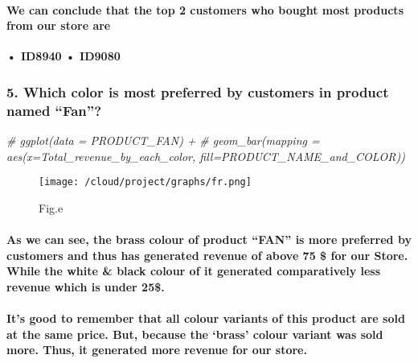 \documentclass[
]{article}
\newenvironment{Shaded}{\begin{snugshade}}{\end{snugshade}}
\newcommand{\CommentTok}[1]{\textcolor[rgb]{0.56,0.35,0.01}{\textit{#1}}}
\begin{document}
\hypertarget{we-can-conclude-that-the-top-2-customers-who-bought-most-products-from-our-store-are}{%
\paragraph{We can conclude that the top 2 customers who bought most
products from our store
are}\label{we-can-conclude-that-the-top-2-customers-who-bought-most-products-from-our-store-are}}

\textbf{• ID8940} \textbf{• ID9080}

\hypertarget{which-color-is-most-preferred-by-customers-in-product-named-fan-1}{%
\subsubsection{5. Which color is most preferred by customers in product
named
``Fan''?}\label{which-color-is-most-preferred-by-customers-in-product-named-fan-1}}

\begin{Shaded}
\begin{Highlighting}[]
\CommentTok{\# ggplot(data = PRODUCT\_FAN) +}
\CommentTok{\#   geom\_bar(mapping = aes(x=Total\_revenue\_by\_each\_color, fill=PRODUCT\_NAME\_and\_COLOR))}
\end{Highlighting}
\end{Shaded}

\begin{figure}
\centering
\texttt{[image: /cloud/project/graphs/fr.png]}
\caption{Fig.e}
\end{figure}

\hypertarget{as-we-can-see-the-brass-colour-of-product-fan-is-more-preferred-by-customers-and-thus-has-generated-revenue-of-above-75-for-our-store.-while-the-white-black-colour-of-it-generated-comparatively-less-revenue-which-is-under-25.}{%
\paragraph{As we can see, the brass colour of product ``FAN'' is more
preferred by customers and thus has generated revenue of above 75 \$ for
our Store. While the white \& black colour of it generated comparatively
less revenue which is under
25\$.}\label{as-we-can-see-the-brass-colour-of-product-fan-is-more-preferred-by-customers-and-thus-has-generated-revenue-of-above-75-for-our-store.-while-the-white-black-colour-of-it-generated-comparatively-less-revenue-which-is-under-25.}}

\hypertarget{its-good-to-remember-that-all-colour-variants-of-this-product-are-sold-at-the-same-price.-but-because-the-brass-colour-variant-was-sold-more.-thus-it-generated-more-revenue-for-our-store.}{%
\paragraph{It's good to remember that all colour variants of this
product are sold at the same price. But, because the `brass' colour
variant was sold more. Thus, it generated more revenue for our
store.}\label{its-good-to-remember-that-all-colour-variants-of-this-product-are-sold-at-the-same-price.-but-because-the-brass-colour-variant-was-sold-more.-thus-it-generated-more-revenue-for-our-store.}}
\end{document}
